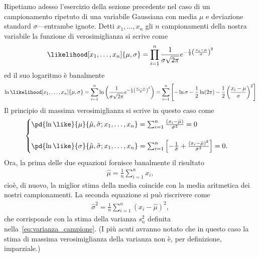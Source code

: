 Ripetiamo adesso l'esercizio della sezione precedente nel caso di un
campionamento ripetuto di una variabile Gaussiana con media $\mu$ e deviazione
standard $\sigma$---entrambe ignote. Detti $x_1,\ldots,x_n$ gli $n$
campionamenti della nostra variabile la funzione di verosimiglianza si scrive
come
\begin{align*}
  \likelihood[x_1,\ldots,x_n]{\mu, \sigma} =
  \prod_{i = 1}^n \frac{1}{\sigma\sqrt{2\pi}}
  e^{-\frac{1}{2}\left(\frac{x_i - \mu}{\sigma}\right)^2}
\end{align*}
ed il suo logaritmo è banalmente
\begin{align*}
  \ln\likelihood[x_1,\ldots,x_n]{\mu, \sigma} =
  \sum_{i = 1}^n \ln \left( \frac{1}{\sigma\sqrt{2\pi}}
  e^{-\frac{1}{2}\left(\frac{x_i - \mu}{\sigma}\right)^2}\right) =
  \sum_{i = 1}^n \left[ -\ln\sigma -\frac{1}{2}\ln (2\pi)
  - \frac{1}{2}\left(\frac{x_i - \mu}{\sigma}\right)^2 \right]
\end{align*}
Il principio di massima verosimiglianza si scrive in questo caso come
\begin{align*}
  \begin{cases}
    \pd{\ln\like}{\mu}{\hat\mu,\hat\sigma;x_1,\ldots,x_n} =
    \sum_{i = 1}^n \frac{(x_i - \hat\mu)}{\hat\sigma^2} =
    0\\[15pt]
    \pd{\ln\like}{\sigma}{\hat\mu,\hat\sigma;x_1,\ldots,x_n} =
    \sum_{i = 1}^n \left[ -\frac{1}{\hat\sigma} +
      \frac{(x_i - \hat\mu)^2}{\hat\sigma^3} \right] =
    0.
   \end{cases}
\end{align*}
Ora, la prima delle due equazioni fornisce banalmente il risultato
\begin{align}
  \hat{\mu} = \frac{1}{n} \sum_{i = 1}^n x_i,
\end{align}
cioè, di nuovo, la miglior stima della media coincide con la media aritmetica
dei nostri campionamenti. La seconda equazione si può riscrivere come
\begin{align}
  \hat\sigma^2 = \frac{1}{n}\sum_{i = 1}^n (x_i - \hat\mu)^2,
\end{align}
che corrisponde con la stima della varianza $s^2_n$ definita
nella~\eqref{eq:varianza_campione}. (I più acuti avranno notato che in
questo caso la stima di massima verosimiglianza della varianza non è, per
definizione, imparziale.)


